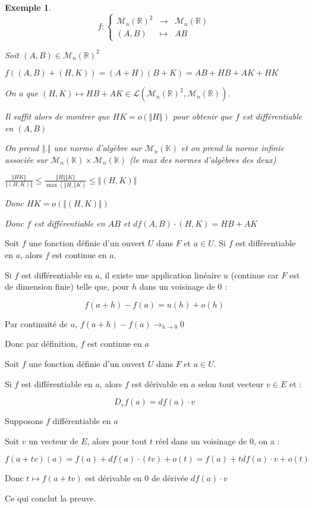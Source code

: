 \documentclass[a4paper,12pt]{book}
\newcommand{\Prop}[2]{\begin{tcolorbox}[sharp corners, colback=white,colframe=red!90!black!75, title=Proposition : #1]#2\end{tcolorbox}}
\newcommand{\Pre}[1]{\begin{tcolorbox}[sharp corners, colback=white,colframe=green!60!green!30!black!75, title=Preuve]#1\end{tcolorbox}}
\newtheorem{Exe}{Exemple}[section]
\def\R{\mathbb{R}}
\def\K{\mathbb{K}}
\begin{document}
\begin{Exe}
$$f:\left\{\begin{array}{rcl}\mathcal{M}_n(\R)^2 & \to & \mathcal{M}_n(\R) \\ (A, B) & \mapsto & AB\end{array}\right.$$
\par Soit $(A, B)\in\mathcal{M}_n(\R)^2$
\par $f((A,B)+(H,K)) = (A+H)(B+K) = AB+HB+AK+HK$
\par On a que $(H,K)\mapsto HB+AK\in\mathcal{L}(\mathcal{M}_n(\R)^2, \mathcal{M}_n(\R))$.
\par Il suffit alors de montrer que $HK = o(\Vert H\Vert)$ pour obtenir que $f$ est différentiable en $(A,B)$
\par On prend $\Vert.\Vert$ une norme d'algèbre sur $\mathcal{M}_n(\K)$ et on prend la norme infinie associée sur $\mathcal{M}_n(\K)\times\mathcal{M}_n(\K)$ (le max des normes d'algèbres des deux)
\par $\frac{\Vert HK\Vert}{\Vert (H, K)\Vert}\leq\frac{\Vert H\Vert\Vert K\Vert}{\max(\Vert H, \Vert K)}\leq \Vert(H, K)\Vert$
\par Donc $HK = o(\Vert (H, K)\Vert)$
\par Donc $f$ est différentiable en $AB$ et $df(A,B)\cdot(H,K) = HB+AK$
\end{Exe}
\Prop{}{Soit $f$ une fonction définie d'un ouvert $U$ dans $F$ et $a\in U$.
Si $f$ est différentiable en $a$, alors $f$ est continue en $a$.}
\Pre{Si $f$ est différentiable en $a$, il existe une application linéaire $u$ (continue car $F$ est de dimension finie) telle que, pour $h$ dans un voisinage de 0 :
\par $$f(a+h)-f(a) = u(h)+o(h)$$
\par Par continuité de $u$, $f(a+h)-f(a)\to_{h\to 0}0$
\par Donc par définition, $f$ est continue en $a$}
\Prop{}{Soit $f$ une fonction définie d'un ouvert $U$ dans $F$ et $a\in U$.
\par Si $f$ est différentiable en $a$, alors $f$ est dérivable en $a$ selon tout vecteur $v\in E$ et :
\par $$D_vf(a) = df(a)\cdot v$$}
\Pre{Supposons $f$ différentiable en $a$
\par Soit $v$ un vecteur de $E$, alors pour tout $t$ réel dans un voisinage de $0$, on a :
\par $$f(a+tv)(a)=f(a)+df(a)\cdot(tv)+o(t) = f(a)+tdf(a)\cdot v+o(t)$$
\par Donc $t\mapsto f(a+tv)$ est dérivable en $0$ de dérivée $df(a)\cdot v$
\par Ce qui conclut la preuve.}
\end{document}
